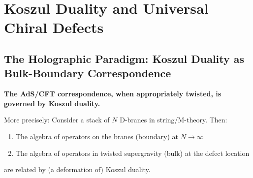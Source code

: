 


\section{Koszul Duality and Universal Chiral Defects}\label{sec:koszul-defects}

\subsection{The Holographic Paradigm: Koszul Duality as Bulk-Boundary Correspondence}

\begin{principle}\label{principle:costello-li}
\textbf{The AdS/CFT correspondence, when appropriately twisted, is governed by Koszul duality.}

More precisely: Consider a stack of $N$ D-branes in string/M-theory. Then:
\begin{enumerate}
\item The algebra of operators on the branes (boundary) at $N \to \infty$
\item The algebra of operators in twisted supergravity (bulk) at the defect location
\end{enumerate}
are related by (a deformation of) Koszul duality.
\end{principle}

